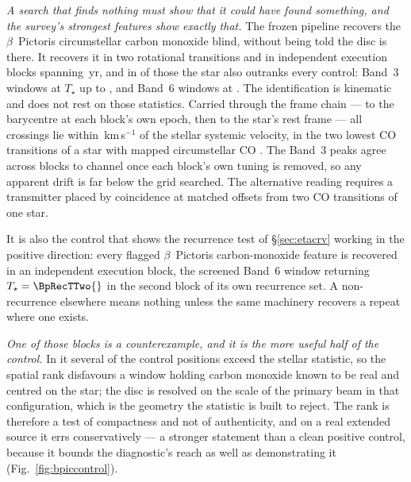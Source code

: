 \emph{A search that finds nothing must show that it could have found
something, and the survey's strongest features show exactly that.} The
frozen pipeline recovers the $\beta$~Pictoris circumstellar carbon monoxide
blind, without being told the disc is there. It recovers it in two
rotational transitions and in \CsBpCoBlocks{} independent execution
blocks spanning \BpBaselineYr\,yr, and in \NStageOneBpicEb{} of those the
star also outranks every control: \BpicNFlagThree{} Band~3 windows at
$T_\star$ up to \BpicBThreeTsym, and \BpicNFlagSix{} Band~6 windows at
\BpicBSixTsym. The identification is kinematic and does not rest on those
statistics. Carried through the frame chain --- to the barycentre at each
block's own epoch, then to the star's rest frame --- all \BpicPanelNCo{}
crossings lie within \BpicDvCoHi\,km\,s$^{-1}$ of the stellar systemic
velocity, in the two lowest CO transitions of a star with mapped
circumstellar CO \citep{Dent2014,Matra2017}. The Band~3 peaks agree across blocks to
\BpRecThreeTuneChanMax{} channel once each block's own tuning is removed, so
any apparent drift is far below the grid searched. The alternative reading
requires a transmitter placed by coincidence at matched offsets from two CO
transitions of one star.

It is also the control that shows the recurrence test of
\S\ref{sec:etacrv} working in the positive direction: every flagged
$\beta$~Pictoris carbon-monoxide feature is recovered in an independent
execution block, the screened Band~6 window returning
$T_\star=\BpRecTTwo{}$ in the second block of its own recurrence set. A
non-recurrence elsewhere means nothing unless the same machinery recovers a
repeat where one exists.

\emph{One of those blocks is a counterexample, and it is the more useful half
of the control.} In it several of the \NCtrl{} control positions exceed the
stellar statistic, so the spatial rank disfavours a window holding carbon
monoxide known to be real and centred on the star; the disc is resolved on
the scale of the primary beam in that configuration, which is the geometry
the statistic is built to reject. The rank is therefore a test of
compactness and not of authenticity, and on a real extended source it errs
conservatively --- a stronger statement than a clean positive control, because
it bounds the diagnostic's reach as well as demonstrating it
(Fig.~\ref{fig:bpiccontrol}).




